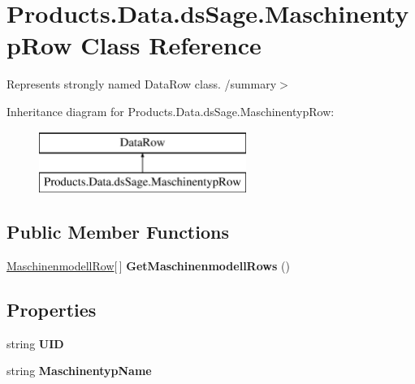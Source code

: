 \hypertarget{class_products_1_1_data_1_1ds_sage_1_1_maschinentyp_row}{}\section{Products.\+Data.\+ds\+Sage.\+Maschinentyp\+Row Class Reference}
\label{class_products_1_1_data_1_1ds_sage_1_1_maschinentyp_row}


Represents strongly named Data\+Row class. /summary$>$  


Inheritance diagram for Products.\+Data.\+ds\+Sage.\+Maschinentyp\+Row\+:\begin{figure}[H]
\begin{center}
\leavevmode
\includegraphics[height=2.000000cm]{class_products_1_1_data_1_1ds_sage_1_1_maschinentyp_row}
\end{center}
\end{figure}
\subsection*{Public Member Functions}
\begin{DoxyCompactItemize}
\item 
\hyperlink{class_products_1_1_data_1_1ds_sage_1_1_maschinenmodell_row}{Maschinenmodell\+Row}\mbox{[}$\,$\mbox{]} {\bfseries Get\+Maschinenmodell\+Rows} ()\hypertarget{class_products_1_1_data_1_1ds_sage_1_1_maschinentyp_row_a42c34b7a0eeed0c3103f9a905af5dce0}{}\label{class_products_1_1_data_1_1ds_sage_1_1_maschinentyp_row_a42c34b7a0eeed0c3103f9a905af5dce0}

\end{DoxyCompactItemize}
\subsection*{Properties}
\begin{DoxyCompactItemize}
\item 
string {\bfseries U\+ID}\hypertarget{class_products_1_1_data_1_1ds_sage_1_1_maschinentyp_row_a6b5025237019fddd69623cc22d5910a8}{}\label{class_products_1_1_data_1_1ds_sage_1_1_maschinentyp_row_a6b5025237019fddd69623cc22d5910a8}

\item 
string {\bfseries Maschinentyp\+Name}\hypertarget{class_products_1_1_data_1_1ds_sage_1_1_maschinentyp_row_a241f39bffb960a62f65689088d318e59}{}\label{class_products_1_1_data_1_1ds_sage_1_1_maschinentyp_row_a241f39bffb960a62f65689088d318e59}

\end{DoxyCompactItemize}



